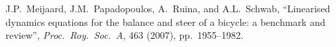 \documentclass[11pt,letterpaper,oneside]{memoir}
\begin{document}
%
%
\mainmatter
\pagestyle{eom}



% 
\backmatter

\begin{thebibliography}{6}
 \addtolength{\itemsep}{-5 pt}
 J.P.~Meijaard, J.M.~Papadopoulos, A.~Ruina, and A.L.~Schwab,
``Linearised dynamics equations for the balance and steer of a bicycle: a benchmark and review'',
\textit{Proc.~Roy.~Soc.~A}, 463 (2007), pp.~1955--1982.

\end{thebibliography}
\end{document}

